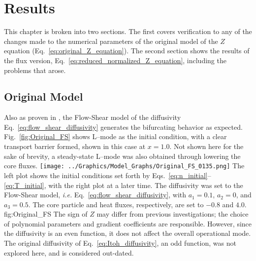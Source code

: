 \chapter{Results}\label{chapter:results}
This chapter is broken into two sections.
The first covers verification to any of the changes made to the numerical parameters of the original model of the $Z$ equation (Eq.~\ref{eq:original_Z_equation}).
The second section shows the results of the flux version, Eq.~\ref{eq:reduced_normalized_Z_equation}, including the problems that arose.

\section{Original Model} \label{sec:original_results}
Also as proven in \cite{paquay_studying_2012}, the Flow-Shear model of the diffusivity Eq.~\ref{eq:flow_shear_diffusivity} generates the bifurcating behavior as expected.
Fig.~\ref{fig:Original_FS} shows L--mode as the initial condition, with a clear transport barrier formed, shown in this case at $x = 1.0$.
Not shown here for the sake of brevity, a steady-state L--mode was also obtained through lowering the core fluxes.
	{\texttt{[image: ../Graphics/Model\_Graphs/Original\_FS\_0135.png]}}
	{The left plot shows the initial conditions set forth by Eqs.~\ref{eq:n_initial}--\ref{eq:T_initial}, with the right plot at a later time.
	The diffusivity was set to the Flow-Shear model, \emph{i.e.} Eq.~\ref{eq:flow_shear_diffusivity}, with $a_1 = 0.1$, $a_2 = 0$, and $a_3 = 0.5$.
	The core particle and heat fluxes, respectively, are set to $-0.8$ and $4.0$.}
	{fig:Original_FS}
The sign of $Z$ may differ from previous investigations; the choice of polynomial parameters and gradient coefficients are responsible.
However, since the diffusivity is an even function, it does not affect the overall operational mode.
The original diffusivity of Eq.~\ref{eq:Itoh_diffusivity}, an odd function, was not explored here, and is considered out-dated.

